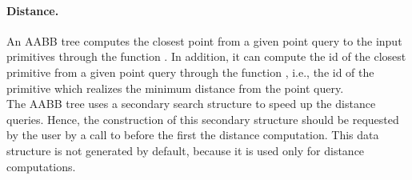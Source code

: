 \paragraph{Distance.} An AABB tree computes the closest point from a given point query to the input primitives through the function . In addition, it can compute the id of the closest primitive from a given point query through the function , i.e., the id of the primitive which realizes the minimum distance from the point query.\\ %

The AABB tree uses a secondary search structure to speed up the distance queries. Hence, the construction of this secondary structure should be requested by the user by a call to  before the first the distance computation. This data structure is not generated by default, because it is used only for distance computations.





